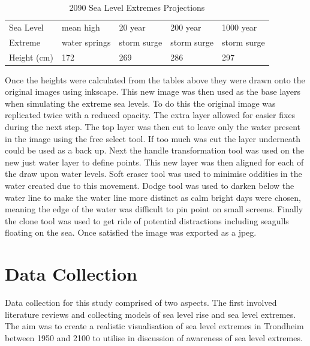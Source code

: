 \begin{table}[h]
    \centering
    \begin{tabular}{|l|l|l|l|l|}
    \hline
       Sea Level &  mean high & 20 year   & 200 year &  1000 year   \\ \newline
       Extreme & water springs &  storm surge  &  storm surge  &  storm surge  \\ \hline
       Height (cm) & 172 & 269 & 286 & 297 \\ \hline
    \end{tabular}
    \caption{2090 Sea Level Extremes Projections}
    \label{2090_sle_projections}
\end{table}

Once the heights were calculated from the tables above they were drawn onto the original images using inkscape. This new image was then used as the base layers when simulating the extreme sea levels. To do this the original image was replicated twice with a reduced opacity. The extra layer allowed for easier fixes during the next step. The top layer was then cut to leave only the water present in the image using the free select tool. If too much was cut the layer underneath could be used as a back up. Next the handle transformation tool was used on the new just water layer to define points. This new layer was then aligned for each of the draw upon water levels. Soft eraser tool was used to minimise oddities in the water created due to this movement. Dodge tool was used to darken below the water line to make the water line more distinct as calm bright days were chosen, meaning the edge of the water was difficult to pin point on small screens. Finally the clone tool was used to get ride of potential distractions including seagulls floating on the sea. Once satisfied the image was exported as a jpeg. 





\section{Data Collection}

Data collection for this study comprised of two aspects.  The first involved literature reviews and collecting models of sea level rise and sea level extremes. The aim was to create a realistic visualisation of sea level extremes in Trondheim between 1950 and 2100 to utilise in discussion of awareness of sea level extremes. 
\paragraph{}

